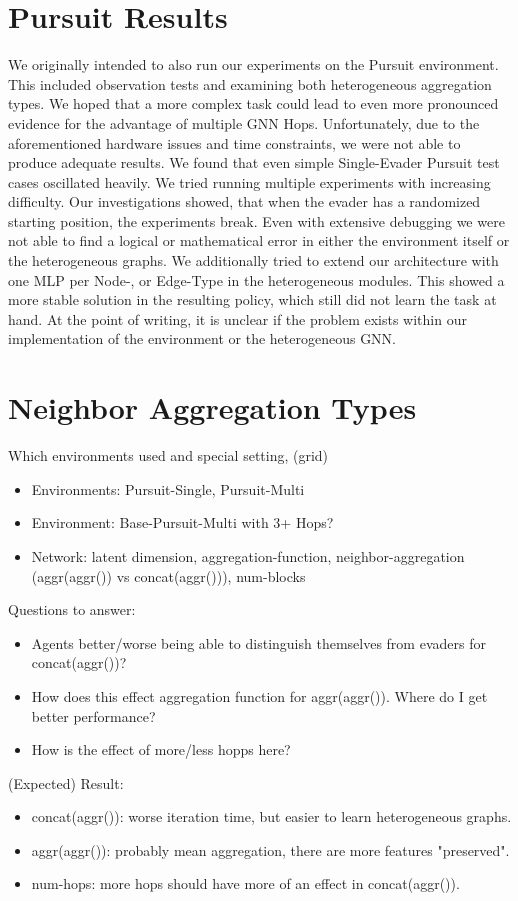 \section{Pursuit Results}
We originally intended to also run our experiments on the Pursuit environment. This included observation tests and examining both heterogeneous aggregation types. We hoped that a more complex task could lead to even more pronounced evidence for the advantage of multiple GNN Hops. Unfortunately, due to the aforementioned hardware issues and time constraints, we were not able to produce adequate results. We found that even simple Single-Evader Pursuit test cases oscillated heavily. We tried running multiple experiments with increasing difficulty. Our investigations showed, that when the evader has a randomized starting position, the experiments break. Even with extensive debugging we were not able to find a logical or mathematical error in either the environment itself or the heterogeneous graphs. We additionally tried to extend our architecture with one MLP per Node-, or Edge-Type in the heterogeneous modules. This showed a more stable solution in the resulting policy, which still did not learn the task at hand. At the point of writing, it is unclear if the problem exists within our implementation of the environment or the heterogeneous GNN.


\iffalse
\section{Neighbor Aggregation Types}
\label{sec:Neighbor Aggregation Types}
Which environments used and special setting, (grid)
\begin{itemize}[noitemsep,nolistsep]
    \item Environments: Pursuit-Single, Pursuit-Multi
    \item Environment: Base-Pursuit-Multi with 3+ Hops?
    \item Network: latent dimension, aggregation-function, neighbor-aggregation (aggr(aggr()) vs concat(aggr())), num-blocks
\end{itemize}
Questions to answer:
\begin{itemize}[noitemsep,nolistsep]
    \item Agents better/worse being able to distinguish themselves from evaders for concat(aggr())?
    \item How does this effect aggregation function for aggr(aggr()). Where do I get better performance?
    \item How is the effect of more/less hopps here?
\end{itemize}
(Expected) Result:
\begin{itemize}[noitemsep,nolistsep]
    \item concat(aggr()): worse iteration time, but easier to learn heterogeneous graphs.
    \item aggr(aggr()): probably mean aggregation, there are more features "preserved".
    \item num-hops: more hops should have more of an effect in concat(aggr()).
\end{itemize}


